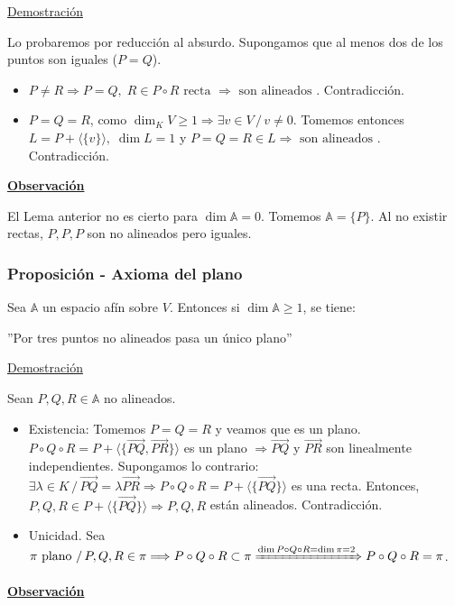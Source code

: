 \documentclass[12pt, a4paper, ones, notitlepage, openany,titlepage]{article}
\newcommand{\demostracion}{\noindent\underline{Demostración}}
\newcommand{\observacion}{\noindent\underline{\textbf{Observación}}}
\begin{document}
\demostracion

Lo probaremos por reducción al absurdo. Supongamos que al menos dos de los puntos son iguales ($P = Q$).
\begin{itemize}
	\item $P \neq R \Longrightarrow P = Q, \; R \in P \circ R \text{ recta } \Longrightarrow \text{ son alineados }$. Contradicción.
	\item $P = Q = R$, como $\dim_K V \ge 1 \Longrightarrow \exists v \in V \,/\, v \neq 0$. Tomemos entonces $L = P + \langle\{v\}\rangle, \; \dim L = 1$ y $P = Q = R \in L \Longrightarrow \text{ son alineados }$. Contradicción.
\end{itemize}

\observacion

El Lema anterior no es cierto para $\dim \mathbb{A} = 0$. Tomemos $\mathbb{A} = \{P\}$. Al no existir rectas, $P,P,P$ son no alineados pero iguales.

\subsubsection{Proposición - Axioma del plano}
\noindent Sea $\mathbb{A}$ un espacio afín sobre $V$. Entonces si $\dim \mathbb{A} \ge 1$, se tiene:
\begin{center}
	''Por tres puntos no alineados pasa un único plano''
\end{center}
\demostracion

\noindent Sean $P,Q,R \in \mathbb{A}$ no alineados.
\begin{itemize}
	\item Existencia: Tomemos $P = Q = R$ y veamos que es un plano. $P \circ Q \circ R = P + \langle\{\overrightarrow{PQ},\overrightarrow{PR}\}\rangle$ es un plano $\Longrightarrow \overrightarrow{PQ}$ y $\overrightarrow{PR}$ son linealmente independientes. Supongamos lo contrario: $\exists \lambda \in K \,/\, \overrightarrow{PQ} = \lambda \overrightarrow{PR} \Longrightarrow P \circ Q \circ R = P + \langle\{\overrightarrow{PQ}\}\rangle$ es una recta. Entonces, $P, Q, R \in P + \langle\{\overrightarrow{PQ}\}\rangle \Longrightarrow P,Q,R$ están alineados. Contradicción.
	
	\item Unicidad. Sea $\pi \text{ plano } /\, P,Q,R \in \pi \Longrightarrow P \circ Q \circ R \subset \pi \xRightarrow{ \dim P \circ Q \circ R = \dim \pi = 2 } P \circ Q \circ R = \pi$.
\end{itemize}
\observacion
\end{document}
